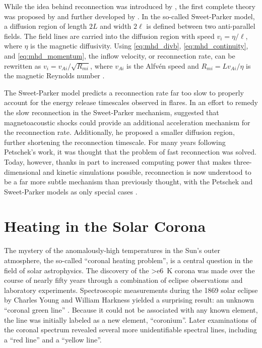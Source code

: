 While the idea behind reconnection was introduced by \citet{dungey_conditions_1953}, the first complete theory was proposed by \citet{sweet_neutral_1958} and further developed by \citet{parker_sweets_1957,parker_solar-flare_1963}. In the so-called Sweet-Parker model, a diffusion region of length $2L$ and width $2\ell$ is defined between two anti-parallel fields. The field lines are carried into the diffusion region with speed $v_i=\eta/\ell$, where $\eta$ is the magnetic diffusivity. Using \autoref{eq:mhd_divb}, \autoref{eq:mhd_continuity}, and \autoref{eq:mhd_momentum}, the inflow velocity, or reconnection rate, can be rewritten as $v_i=v_{Ai}/\sqrt{R_{mi}}$, where $v_{Ai}$ is the Alfv\'{e}n speed and $R_{mi}=Lv_{Ai}/\eta$ is the magnetic Reynolds number \citep{priest_magnetic_2000}. 

The Sweet-Parker model predicts a reconnection rate far too slow to properly account for the energy release timescales observed in flares. In an effort to remedy the slow reconnection in the Sweet-Parker mechanism, \citet{petschek_magnetic_1964} suggested that magnetoacoustic shocks could provide an additional acceleration mechanism for the reconnection rate. Additionally, he proposed a smaller diffusion region, further shortening the reconnection timescale. For many years following Petschek's work, it was thought that the problem of fast reconnection was solved. Today, however, thanks in part to increased computing power that makes three-dimensional and kinetic simulations possible, reconnection is now understood to be a far more subtle mechanism than previously thought, with the Petschek and Sweet-Parker models as only special cases \citep{priest_magnetic_2000}.

\section{Heating in the Solar Corona}\label{sec:coronal-heating}

The mystery of the anomalously-high temperatures in the Sun's outer atmosphere, the so-called ``coronal heating problem'', is a central question in the field of solar astrophysics. The discovery of the \SI{>e6}{\kelvin} corona was made over the course of nearly fifty years through a combination of eclipse observations and laboratory experiments. Spectroscopic measurements during the 1869 solar eclipse by Charles Young and William Harkness yielded a surprising result: an unknown ``coronal green line'' \citep{golub_solar_2010}. Because it could not be associated with any known element, the line was initially labeled as a new element, ``coronium''. Later examinations of the coronal spectrum revealed several more unidentifiable spectral lines, including a ``red line'' and a ``yellow line''.

